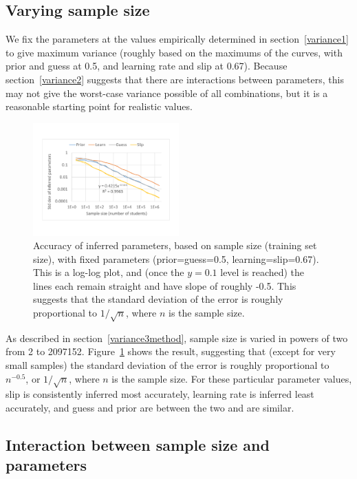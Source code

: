 \documentclass{edm_template}
\begin{document}
\subsection{Varying sample size}

We fix the parameters at the values empirically determined in section~\ref{variance1} to give maximum variance (roughly based on the maximums of the curves, with prior and guess at 0.5, and learning rate and slip at 0.67). Because section~\ref{variance2} suggests that there are interactions between parameters, this may not give the worst-case variance possible of all combinations, but it is a reasonable starting point for realistic values.

\begin{figure}
\centering
\includegraphics[width=0.5\textwidth]{data/variance3.pdf}
\caption{Accuracy of inferred parameters, based on sample size (training set size), with fixed parameters (prior=guess=0.5, learning=slip=0.67). This is a log-log plot, and (once the $y=0.1$ level is reached) the lines each remain straight and have slope of roughly -0.5. This suggests that the standard deviation of the error is roughly proportional to $1/\sqrt{n}$, where $n$ is the sample size.}
\label{fig:variance3}
\end{figure}

As described in section~\ref{variance3method}, sample size is varied in powers of two from 2 to 2097152. Figure~\ref{fig:variance3} shows the result, suggesting that (except for very small samples) the standard deviation of the error is roughly proportional to $n^{-0.5}$, or $1/\sqrt{n}$, where $n$ is the sample size. For these particular parameter values, slip is consistently inferred most accurately, learning rate is inferred least accurately, and guess and prior are between the two and are similar.

\subsection{Interaction between sample size and parameters}
\end{document}
